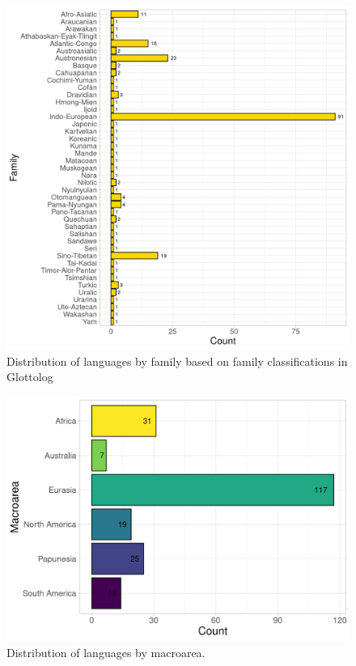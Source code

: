 \begin{figure}
	\centering
	\includegraphics[width=1\linewidth]{jipa/images/graph_families_JIPA}
	\caption[Distribution of languages by family]{Distribution of languages by family based on family classifications in Glottolog \parencite{glottolog}}
	\label{fig:graphfamiliesjipa}
\end{figure}

\begin{figure}
	\centering
	\includegraphics[width=1\linewidth]{jipa/images/graph_macroarea_JIPA}
	\caption[Distribution of languages by macroarea]{Distribution of languages by macroarea.}
	\label{fig:graphmacroareajipa}
\end{figure}

